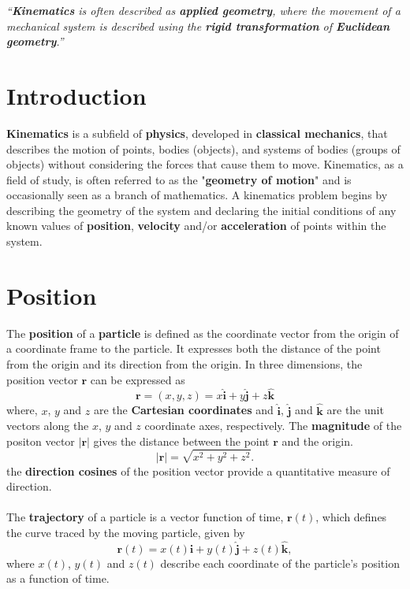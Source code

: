\emph{``\textbf{Kinematics} is often described as \textbf{applied geometry}, where the movement of a mechanical system is described using the \textbf{rigid transformation} of \textbf{Euclidean geometry}.''}

\section{Introduction}
\textbf{Kinematics} is a subfield of \textbf{physics}, developed in \textbf{classical mechanics}, that describes the motion of points, bodies (objects), and systems of bodies (groups of objects) without considering the forces that cause them to move. Kinematics, as a field of study, is often referred to as the "\textbf{geometry of motion}" and is occasionally seen as a branch of mathematics. A kinematics problem begins by describing the geometry of the system and declaring the initial conditions of any known values of \textbf{position}, \textbf{velocity} and/or \textbf{acceleration} of points within the system.

\section{Position}
The \textbf{position} of a \textbf{particle} is defined as the coordinate vector from the origin of a coordinate frame to the particle. It expresses both the distance of the point from the origin and its direction from the origin. In three dimensions, the position vector $\mathbf{r}$ can be expressed as
\[
\mathbf{r} = (x, y, z) = x\hat{\mathbf{i}} + y\hat{\mathbf{j}} + z\hat{\mathbf{k}}
\]
where, $x$, $y$ and $z$ are the \textbf{Cartesian coordinates} and $\hat{\mathbf{i}}$, $\hat{\mathbf{j}}$ and $\hat{\mathbf{k}}$ are the unit vectors along the $x$, $y$ and $z$ coordinate axes, respectively. The \textbf{magnitude} of the positon vector $|\mathbf{r}|$ gives the distance between the point $\mathbf{r}$ and the origin.
\[
|\mathbf{r}| = \sqrt{x^2 + y^2 + z^2}.
\]
the \textbf{direction cosines} of the position vector provide a quantitative measure of direction.
\\\\
The \textbf{trajectory} of a particle is a vector function of time, $\mathbf{r}(t)$, which defines the curve traced by the moving particle, given by
\[
\mathbf{r}(t) = x(t)\hat{\mathbf{i}} + y(t)\hat{\mathbf{j}} + z(t)\hat{\mathbf{k}},
\]
where $x(t)$, $y(t)$ and $z(t)$ describe each coordinate of the particle's position as a function of time.

